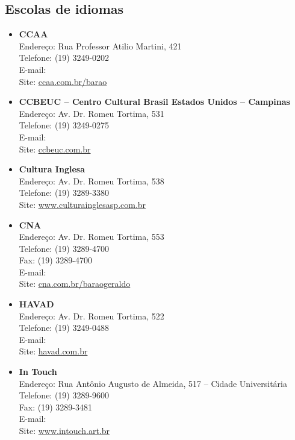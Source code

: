 \subsection{Escolas de idiomas}

\begin{itemize}
    \item   \textbf{CCAA}
        \\Endereço: Rua Professor Atilio Martini, 421
        \\Telefone: (19) 3249-0202
        \\E-mail: 
        \\Site: \url{ccaa.com.br/barao}

    \item   \textbf{CCBEUC -- Centro Cultural Brasil Estados Unidos -- Campinas}
        \\Endereço: Av. Dr. Romeu Tortima, 531
        \\Telefone: (19) 3249-0275
        \\E-mail: 
        \\Site: \url{ccbeuc.com.br}
        
    \item   \textbf{Cultura Inglesa}
        \\Endereço: Av. Dr. Romeu Tortima, 538
        \\Telefone: (19) 3289-3380
        \\Site: \url{www.culturainglesasp.com.br}

    \item   \textbf{CNA}
        \\Endereço: Av. Dr. Romeu Tortima, 553
        \\Telefone: (19) 3289-4700
        \\Fax: (19) 3289-4700
        \\E-mail: 
        \\Site: \url{cna.com.br/baraogeraldo}

    \item   \textbf{HAVAD}
        \\Endereço: Av. Dr. Romeu Tortima, 522
        \\Telefone: (19) 3249-0488
        \\E-mail: 
        \\Site: \url{havad.com.br}

    \item   \textbf{In Touch}
        \\Endereço: Rua Antônio Augusto de Almeida, 517 -- Cidade Universitária
        \\Telefone: (19) 3289-9600
        \\Fax: (19) 3289-3481
        \\E-mail: 
        \\Site: \url{www.intouch.art.br}


\end{itemize}
